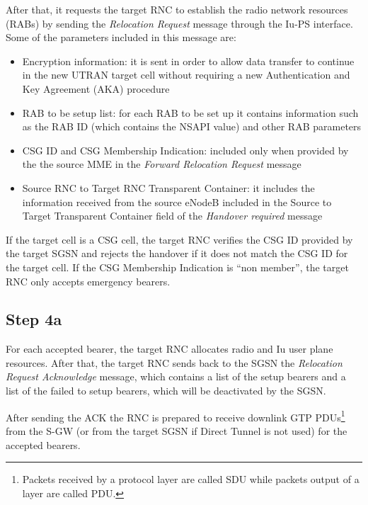 After that, it requests the target RNC to establish the radio
network resources (RABs) by sending the
\emph{Relocation Request} message through the Iu-PS interface. Some of the
parameters included in this message are:
\begin{itemize}
	\item Encryption information: it is sent in order to allow data transfer to
	continue in the new UTRAN target cell without requiring a new Authentication
	and Key Agreement (AKA) procedure
	\item RAB to be setup list: for each RAB to be set up it contains information
	such as the RAB ID (which contains the NSAPI value) and other RAB parameters
	\item CSG ID and CSG Membership Indication: included only when provided by
	the the source MME in the \emph{Forward Relocation Request} message
	\item Source RNC to Target RNC Transparent Container: it includes the information
	received from the source eNodeB included in the Source to Target Transparent
	Container field of the \emph{Handover required} message
\end{itemize}
If the target cell is a CSG cell, the target RNC verifies the CSG ID provided
by the target SGSN and rejects the handover if it does not match the CSG ID for
the target cell. If the CSG Membership Indication is ``non member'', the target
RNC only accepts emergency bearers.



\subsection*{Step 4a}
For each accepted bearer, the target RNC allocates radio and Iu
user plane resources. After that, the target RNC sends back to the SGSN the
\emph{Relocation Request Acknowledge} message, which contains a list of the
setup bearers and a list of the failed to setup bearers, which will be deactivated
by the SGSN.

After sending the ACK the RNC is prepared to receive downlink GTP
PDUs\footnote{Packets received by a protocol layer are called SDU while packets
output of a layer are called PDU.}
from the S-GW (or from the target SGSN if Direct Tunnel is not used) for the
accepted bearers.


